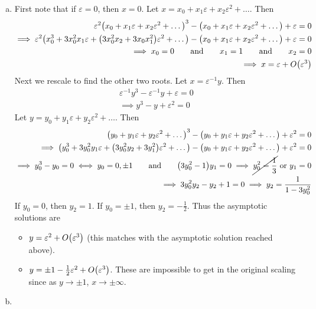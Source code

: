 \documentclass{article} %
\theoremstyle{plain}
\newcommand{\E}{\varepsilon}
\numberwithin{equation}{section} %
\numberwithin{figure}{section} %
\numberwithin{table}{section} %
\begin{document}
\begin{enumerate}[(a)]
    \item
        First note that if $\E = 0$, then $x = 0$.  Let $x = x_0 + x_1 \E + x_2 \E^2 + \dots$.  Then
        \begin{align*}
            \E^2\qty(x_0 + x_1 \E + x_2 \E^2 + \dots)^3 - \qty(x_0 + x_1 \E + x_2 \E^2 + \dots) + \E = 0 \\
            \implies \E^2\qty(x_0^3 + 3x_0^2x_1 \E + \qty(3x_0^2x_2 + 3x_0x_1^2) \E^2 + \dots) - \qty(x_0 + x_1\E + x_2 \E^2 + \dots) + \E = 0 \\
            \implies x_0 = 0 \qquad \text{and} \qquad x_1 = 1 \qquad \text{and} \qquad x_2 = 0 \\
            \implies x = \E + O\qty(\E^3)
        \end{align*}
        Next we rescale to find the other two roots.  Let $x = \E^{-1} y$.  Then
        \begin{align*}
            \E^{-1}y^3 - \E^{-1}y + \E = 0 \\
            \implies y^3 - y + \E^2 = 0
        \end{align*}
        Let $y = y_0 + y_1 \E + y_2 \E^2 + \dots$.  Then
        \begin{align*}
            \qty(y_0 + y_1 \E + y_2 \E^2 + \dots)^3 - \qty(y_0 + y_1 \E + y_2 \E^2 + \dots) + \E^2 = 0 \\
            \implies \qty(y_0^3 + 3y_0^2y_1 \E + \qty(3y_0^2y_2 + 3y_1^2)\E^2 + \dots) - \qty(y_0 + y_1 \E + y_2 \E^2 + \dots) + \E^2 = 0 \\
            \implies y_0^3 - y_0 = 0 \iff y_0 = 0, \pm 1 \qquad \text{and} \qquad \qty(3y_0^2 - 1)y_1 = 0 \implies \cancel{y_0^2 = \frac{1}{3}} \text{ or } y_1 = 0 \\
            \implies 3y_0^2y_2 - y_2 + 1 = 0 \implies y_2 = \frac{1}{1 - 3y_0^2}
        \end{align*}
        If $y_0 = 0$, then $y_2 = 1$.  If $y_0 = \pm 1$, then $y_2 = -\frac{1}{2}$.  Thus the asymptotic solutions are
        \begin{itemize}
            \item $y = \E^2 + O\qty(\E^3)$ (this matches with the asymptotic solution reached above).
            \item $y = \pm 1 - \frac{1}{2}\E^2 + O\qty(\E^3)$.  These are impossible to get in the original scaling since as $y \rightarrow \pm 1$, $x \rightarrow \pm \infty$.
        \end{itemize}
    \item

\end{enumerate}
\end{document}
